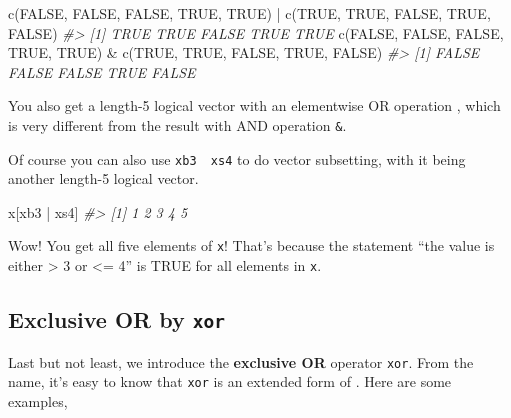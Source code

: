 \documentclass[
]{book}
\newenvironment{Shaded}{\begin{snugshade}}{\end{snugshade}}
\newcommand{\CommentTok}[1]{\textcolor[rgb]{0.56,0.35,0.01}{\textit{#1}}}
\newcommand{\ConstantTok}[1]{\textcolor[rgb]{0.00,0.00,0.00}{#1}}
\newcommand{\FunctionTok}[1]{\textcolor[rgb]{0.00,0.00,0.00}{#1}}
\newcommand{\NormalTok}[1]{#1}
\newcommand{\SpecialCharTok}[1]{\textcolor[rgb]{0.00,0.00,0.00}{#1}}
\begin{document}
\begin{Shaded}
\begin{Highlighting}[]
\FunctionTok{c}\NormalTok{(}\ConstantTok{FALSE}\NormalTok{, }\ConstantTok{FALSE}\NormalTok{, }\ConstantTok{FALSE}\NormalTok{, }\ConstantTok{TRUE}\NormalTok{, }\ConstantTok{TRUE}\NormalTok{) }\SpecialCharTok{|} \FunctionTok{c}\NormalTok{(}\ConstantTok{TRUE}\NormalTok{, }\ConstantTok{TRUE}\NormalTok{, }\ConstantTok{FALSE}\NormalTok{, }\ConstantTok{TRUE}\NormalTok{, }\ConstantTok{FALSE}\NormalTok{)}
\CommentTok{\#\textgreater{} [1]  TRUE  TRUE FALSE  TRUE  TRUE}
\FunctionTok{c}\NormalTok{(}\ConstantTok{FALSE}\NormalTok{, }\ConstantTok{FALSE}\NormalTok{, }\ConstantTok{FALSE}\NormalTok{, }\ConstantTok{TRUE}\NormalTok{, }\ConstantTok{TRUE}\NormalTok{) }\SpecialCharTok{\&} \FunctionTok{c}\NormalTok{(}\ConstantTok{TRUE}\NormalTok{, }\ConstantTok{TRUE}\NormalTok{, }\ConstantTok{FALSE}\NormalTok{, }\ConstantTok{TRUE}\NormalTok{, }\ConstantTok{FALSE}\NormalTok{)}
\CommentTok{\#\textgreater{} [1] FALSE FALSE FALSE  TRUE FALSE}
\end{Highlighting}
\end{Shaded}

You also get a length-5 logical vector with an elementwise OR operation \texttt{\textbar{}}, which is very different from the result with AND operation \texttt{\&}.

Of course you can also use \texttt{xb3\ \textbar{}\ xs4} to do vector subsetting, with it being another length-5 logical vector.

\begin{Shaded}
\begin{Highlighting}[]
\NormalTok{x[xb3 }\SpecialCharTok{|}\NormalTok{ xs4]}
\CommentTok{\#\textgreater{} [1] 1 2 3 4 5}
\end{Highlighting}
\end{Shaded}

Wow! You get all five elements of \texttt{x}! That's because the statement ``the value is either \textgreater{} 3 or \textless= 4'' is TRUE for all elements in \texttt{x}.

\hypertarget{exclusive-or-by-xor}{%
\subsection{\texorpdfstring{Exclusive OR by \texttt{xor}}{Exclusive OR by xor}}\label{exclusive-or-by-xor}}

Last but not least, we introduce the \textbf{exclusive OR} operator \texttt{xor}. From the name, it's easy to know that \texttt{xor} is an extended form of \texttt{\textbar{}}. Here are some examples,
\end{document}
